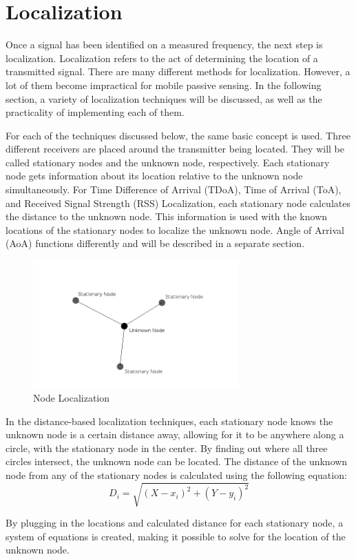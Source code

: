 \section{Localization}
Once a signal has been identified on a measured frequency, the next step is localization. Localization refers to the act of determining the location of a transmitted signal. There are many different methods for localization. However, a lot of them become impractical for mobile passive sensing. In the following section, a variety of localization techniques will be discussed, as well as the practicality of implementing each of them.\par
For each of the techniques discussed below, the same basic concept is used. Three different receivers are placed around the transmitter being located. They will be called stationary nodes and the unknown node, respectively. Each stationary node gets information about its location relative to the unknown node simultaneously. For Time Difference of Arrival (TDoA), Time of Arrival (ToA), and Received Signal Strength (RSS) Localization, each stationary node calculates the distance to the unknown node. This information is used with the known locations of the stationary nodes to localize the unknown node.
Angle of Arrival (AoA) functions differently and will be described in a separate section.
\begin{figure}[ht]
\centering
\includegraphics[width=0.70\textwidth]{img/node-localization-lines.png}
\caption{Node Localization}
\label{fig:node_localization}
\end{figure}\par
In the distance-based localization techniques, each stationary node knows the unknown node is a certain distance away, allowing for it to be anywhere along a circle, with the stationary node in the center. By finding out where all three circles intersect, the unknown node can be located. The distance of the unknown node from any of the stationary nodes is calculated using the following equation:
\[D_i =\sqrt{(X - x_i)^2 + (Y-y_i)^2}\]\par
By plugging in the locations and calculated distance for each stationary node, a system of equations is created, making it possible to solve for the location of the unknown node.

